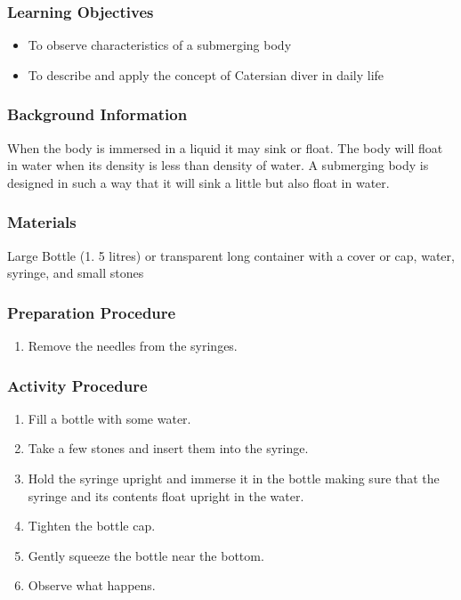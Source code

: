 \subsubsection*{Learning Objectives}
\begin{itemize}
\item{To observe characteristics of a submerging body}
\item{To describe and apply the concept of Catersian diver in daily life}
\end{itemize}

\subsubsection*{Background Information}
When the body is immersed in a liquid it may sink or float. The body will float in water when its density is less than density of water. A submerging body is designed in such a way that it will sink a little but also float in water.  

\subsubsection*{Materials}
Large Bottle (1.  5 litres) or transparent long container with a cover or cap, water, syringe, and small stones

\subsubsection*{Preparation Procedure}
\begin{enumerate}
\item{Remove the needles from the syringes.}
\end{enumerate}

\subsubsection*{Activity Procedure}
\begin{enumerate}
\item{Fill a bottle with some water.}
\item{Take a few stones and insert them into the syringe.}
\item{Hold the syringe upright and immerse it in the bottle making sure that the syringe and its contents float upright in the water.}
\item{Tighten the bottle cap.}
\item{Gently squeeze the bottle near the bottom.} 
\item{Observe what happens.}
\end{enumerate}

